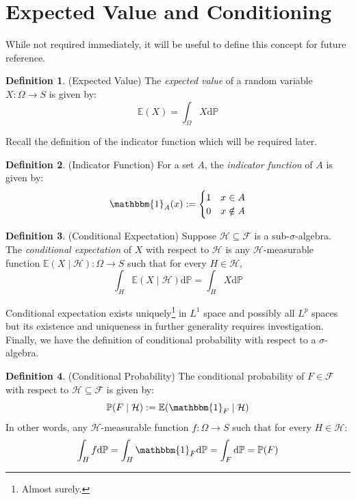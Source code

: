 \documentclass[a4paper,11pt,oneside]{book}
\theoremstyle{plain}
\theoremstyle{definition}
\newtheorem{defn}{Definition}[section]
\begin{document}
\section{Expected Value and Conditioning}
While not required immediately, it will be useful to define this concept for future reference.
\begin{defn}{(Expected Value)} The \emph{expected value} of a random variable $X:\Omega \rightarrow S$ is given by: \[\mathbb{E}(X) = \int_\Omega X\mathrm{d}\mathbb{P}\]
\end{defn}
Recall the definition of the indicator function which will be required later.
\begin{defn}{(Indicator Function)} For a set $A$, the \emph{indicator function} of $A$ is given by:
\[\mathbbm{1}_A(x):=\begin{cases} 1 & x \in A\\ 0 & x \notin A \end{cases}\]
\end{defn}
\begin{defn}{(Conditional Expectation)}
Suppose $\mathcal{H} \subseteq \mathcal{F}$ is a sub-$\sigma$-algebra. The \emph{conditional expectation} of $X$ with respect to $\mathcal{H}$ is any $\mathcal{H}$-measurable function $\mathbb{E}(X\mid \mathcal{H}):\Omega \rightarrow S$ such that for every $H \in \mathcal{H}$,
\[\int_H \mathbb{E}(X\mid \mathcal{H})\mathrm{d}\mathbb{P} = \int_H X\mathrm{d}\mathbb{P}\]
\end{defn}
Conditional expectation exists uniquely\footnote{Almost surely.} in $L^1$ space and possibly all $L^p$ spaces but its existence and uniqueness in further generality requires investigation. Finally, we have the definition of conditional probability with respect to a $\sigma$-algebra.
\begin{defn}{(Conditional Probability)} The conditional probability of $F \in \mathcal{F}$ with respect to $\mathcal{H} \subseteq \mathcal{F}$ is given by: \[\mathbb{P}(F \mid \mathcal{H}) := \mathbb{E}(\mathbbm{1}_F \mid \mathcal{H})\] In other words, any $\mathcal{H}$-measurable function $f:\Omega \rightarrow S$ such that for every $H \in \mathcal{H}$:
\[\int_H f\mathrm{d}\mathbb{P} = \int_H \mathbbm{1}_F\mathrm{d}\mathbb{P}=\int_F\mathrm{d}\mathbb{P}=\mathbb{P}(F)\]
\end{defn}
\end{document}
